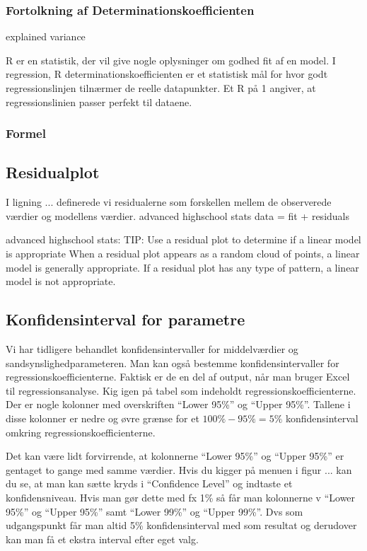 \subsubsection{Fortolkning af Determinationskoefficienten}


explained variance

R er en statistik, der vil give nogle oplysninger om godhed fit af en model. I regression, R determinationskoefficienten er et statistisk mål for hvor godt regressionslinjen tilnærmer de reelle datapunkter. Et R på 1 angiver, at regressionslinien passer perfekt til dataene.

\subsubsection{Formel}


\subsection{Residualplot}
I ligning ... definerede vi residualerne som forskellen mellem de observerede værdier og modellens værdier.
advanced highschool stats
data = fit + residuals

advanced highschool stats:
TIP: Use a residual plot to determine if a linear model is appropriate
When a residual plot appears as a random cloud of points, a linear model is generally
appropriate. If a residual plot has any type of pattern, a linear model is not
appropriate.

\subsection{Konfidensinterval for parametre}
Vi har tidligere behandlet konfidensintervaller for middelværdier og sandsynslighedparameteren. Man kan også bestemme konfidensintervaller for regressionskoefficienterne. Faktisk er de en del af output, når man bruger Excel til regressionsanalyse. Kig igen på tabel  som indeholdt regressionskoefficienterne. Der er nogle kolonner med overskriften ``Lower 95\%'' og ``Upper 95\%''. Tallene i disse kolonner er nedre og øvre grænse for et \(100\% - 95\% = 5\%\) konfidensinterval omkring regressionskoefficienterne.

Det kan være lidt forvirrende, at kolonnerne ``Lower 95\%'' og ``Upper 95\%'' er gentaget to gange med samme værdier. Hvis du kigger på menuen i figur ... kan du se, at man kan sætte kryds i ``Confidence Level'' og indtaste et konfidensniveau. Hvis man gør dette med fx 1\% så får man kolonnerne v ``Lower 95\%'' og ``Upper 95\%'' samt  ``Lower 99\%'' og ``Upper 99\%''. Dvs som udgangspunkt får man altid 5\% konfidensinterval med som resultat og derudover kan man få et ekstra interval efter eget valg.






